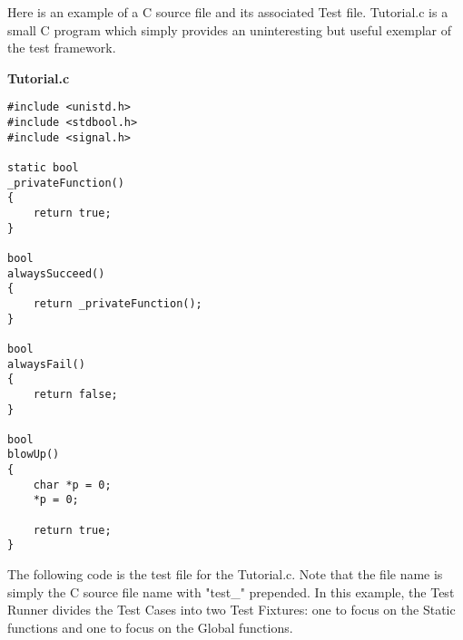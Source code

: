 Here is an example of a C source file and its associated Test file.  Tutorial.c is a small C program which simply  provides an uninteresting but useful exemplar of the test framework.


\noindent \textbf{Tutorial.c}

\begin{lstlisting}
#include <unistd.h>
#include <stdbool.h>
#include <signal.h>

static bool
_privateFunction()
{
    return true;
}

bool
alwaysSucceed()
{
	return _privateFunction();
}

bool
alwaysFail()
{
	return false;
}

bool
blowUp()
{
    char *p = 0;
    *p = 0;
    
    return true;
}

\end{lstlisting}

The following code is the test file for the Tutorial.c.  Note that the file name is simply the C source file name with "test\_" prepended. In this example, the Test Runner divides the Test Cases into two Test Fixtures: one to focus on the Static functions and one to focus on the Global functions.

